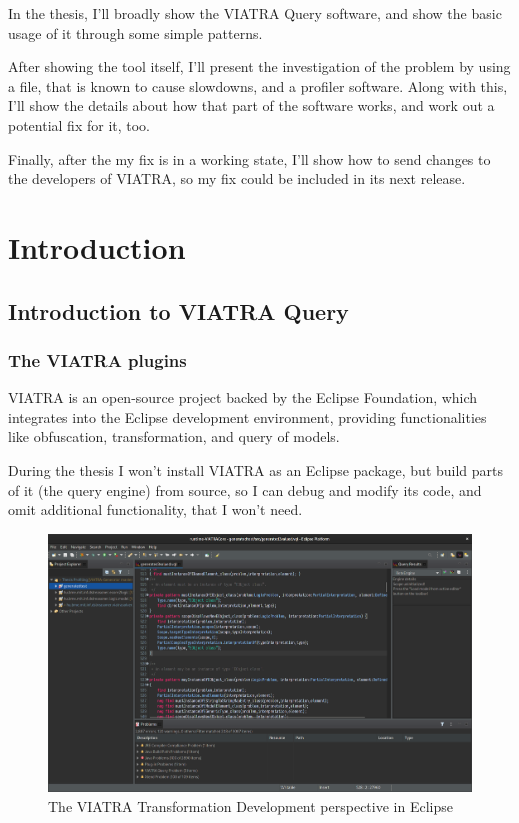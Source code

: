 \documentclass[11pt,a4paper,oneside]{report}
\begin{document}
In the thesis, I'll broadly show the VIATRA Query software, and show the
basic usage of it through some simple patterns.

After showing the tool itself, I'll present the investigation of the problem by
using a file, that is known to cause slowdowns, and a profiler software. Along
with this, I'll show the details about how that part of the software works, and
work out a potential fix for it, too.

Finally, after the my fix is in a working state, I'll show how to send changes
to the developers of VIATRA, so my fix could be included in its next release.
\vfill


\cleardoublepage
\selectthesislanguage
{}
\setcounter{romanPage}{\value{page}}


\chapter{Introduction}
\section{Introduction to VIATRA Query}
\subsection{The VIATRA plugins}
VIATRA is an open-source project backed by the Eclipse Foundation, which
integrates into the Eclipse development environment, providing functionalities
like obfuscation, transformation, and query of models.

During the thesis I won't install VIATRA as an Eclipse package, but build parts
of it (the query engine) from source, so I can debug and modify its code, and
omit additional functionality, that I won't need.

\begin{figure}[ht]
\centering
\includegraphics[width=150mm, keepaspectratio]{figures/eclipse-viatra.png}
\caption{The VIATRA Transformation Development perspective in Eclipse}
\label{fig:eclipse-viatra}
\end{figure}
\end{document}
